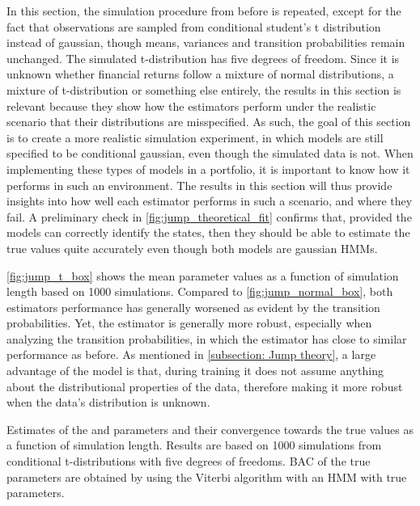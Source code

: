 In this section, the simulation procedure from before is repeated, except for the fact that observations are sampled from conditional student's t distribution instead of gaussian, though means, variances and transition probabilities remain unchanged. The simulated t-distribution has five degrees of freedom. Since it is unknown whether financial returns follow a mixture of normal distributions, a mixture of t-distribution or something else entirely, the results in this section is relevant because they show how the estimators perform under the realistic scenario that their distributions are misspecified. As such, the goal of this section is to create a more realistic simulation experiment, in which models are still specified to be conditional gaussian, even though the simulated data is not. When implementing these types of models in a portfolio, it is important to know how it performs in such an environment. The results in this section will thus provide insights into how well each estimator performs in such a scenario, and where they fail. A preliminary check in \cref{fig:jump_theoretical_fit} confirms that, provided the models can correctly identify the states, then they should be able to estimate the true values quite accurately even though both models are gaussian HMMs.

\cref{fig:jump_t_box} shows the mean parameter values as a function of simulation length based on 1000 simulations. Compared to \cref{fig:jump_normal_box}, both estimators performance has generally worsened as evident by the transition probabilities. Yet, the \jump estimator is generally more robust, especially when analyzing the transition probabilities, in which the \jump estimator has close to similar performance as before. As mentioned in \cref{subsection: Jump theory}, a large advantage of the \jump model is that, during training it does not assume anything about the distributional properties of the data, therefore making it more robust when the data's distribution is unknown.

\begin{table}[H]
\centering

\caption[Estimates from conditional t-distributions of the \mle and \jump parameters and their convergence towards the true values]{Estimates of the \mle and \jump parameters and their convergence towards the true values as a function of simulation length. Results are based on 1000 simulations from conditional t-distributions with five degrees of freedoms.  BAC of the true parameters are obtained by using the Viterbi algorithm with an HMM with true parameters.}

\label{tab:sim_misspec_t}
\end{table}

